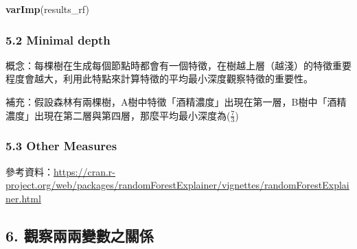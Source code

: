 \documentclass[]{book}
\newenvironment{Shaded}{\begin{snugshade}}{\end{snugshade}}
\newcommand{\KeywordTok}[1]{\textcolor[rgb]{0.13,0.29,0.53}{\textbf{#1}}}
\newcommand{\DataTypeTok}[1]{\textcolor[rgb]{0.13,0.29,0.53}{#1}}
\newcommand{\DecValTok}[1]{\textcolor[rgb]{0.00,0.00,0.81}{#1}}
\newcommand{\StringTok}[1]{\textcolor[rgb]{0.31,0.60,0.02}{#1}}
\newcommand{\OperatorTok}[1]{\textcolor[rgb]{0.81,0.36,0.00}{\textbf{#1}}}
\newcommand{\NormalTok}[1]{#1}
\begin{document}
\begin{Shaded}
\begin{Highlighting}[]
\KeywordTok{varImp}\NormalTok{(results_rf)}
\end{Highlighting}
\end{Shaded}

\hypertarget{minimal-depth}{%
\subsubsection{5.2 Minimal depth}\label{minimal-depth}}

概念：每棵樹在生成每個節點時都會有一個特徵，在樹越上層（越淺）的特徵重要程度會越大，利用此特點來計算特徵的平均最小深度觀察特徵的重要性。

補充：假設森林有兩棵樹，A樹中特徵「酒精濃度」出現在第一層，B樹中「酒精濃度」出現在第二層與第四層，那麼平均最小深度為(\(\frac{7}{3}\))

\begin{Shaded}
\end{Shaded}

\hypertarget{other-measures}{%
\subsubsection{5.3 Other Measures}\label{other-measures}}

參考資料：\url{https://cran.r-project.org/web/packages/randomForestExplainer/vignettes/randomForestExplainer.html}

\begin{Shaded}
\end{Shaded}

\subsection{6. 觀察兩兩變數之關係}
\end{document}
